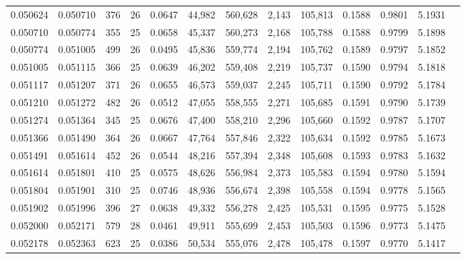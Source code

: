 \begin{tabular}{rrrrrrrrrrrrr}
0.050624 & 0.050710 & 376 &  26 &                                     0.0647 &  44,982 & 560,628 &   2,143 & 105,813 & 0.1588 & 0.9801 & 5.1931 \\
0.050710 & 0.050774 & 355 &  25 &                                     0.0658 &  45,337 & 560,273 &   2,168 & 105,788 & 0.1588 & 0.9799 & 5.1898 \\
0.050774 & 0.051005 & 499 &  26 &                                     0.0495 &  45,836 & 559,774 &   2,194 & 105,762 & 0.1589 & 0.9797 & 5.1852 \\
0.051005 & 0.051115 & 366 &  25 &                                     0.0639 &  46,202 & 559,408 &   2,219 & 105,737 & 0.1590 & 0.9794 & 5.1818 \\
0.051117 & 0.051207 & 371 &  26 &                                     0.0655 &  46,573 & 559,037 &   2,245 & 105,711 & 0.1590 & 0.9792 & 5.1784 \\
0.051210 & 0.051272 & 482 &  26 &                                     0.0512 &  47,055 & 558,555 &   2,271 & 105,685 & 0.1591 & 0.9790 & 5.1739 \\
0.051274 & 0.051364 & 345 &  25 &                                     0.0676 &  47,400 & 558,210 &   2,296 & 105,660 & 0.1592 & 0.9787 & 5.1707 \\
0.051366 & 0.051490 & 364 &  26 &                                     0.0667 &  47,764 & 557,846 &   2,322 & 105,634 & 0.1592 & 0.9785 & 5.1673 \\
0.051491 & 0.051614 & 452 &  26 &                                     0.0544 &  48,216 & 557,394 &   2,348 & 105,608 & 0.1593 & 0.9783 & 5.1632 \\
0.051614 & 0.051801 & 410 &  25 &                                     0.0575 &  48,626 & 556,984 &   2,373 & 105,583 & 0.1594 & 0.9780 & 5.1594 \\
0.051804 & 0.051901 & 310 &  25 &                                     0.0746 &  48,936 & 556,674 &   2,398 & 105,558 & 0.1594 & 0.9778 & 5.1565 \\
0.051902 & 0.051996 & 396 &  27 &                                     0.0638 &  49,332 & 556,278 &   2,425 & 105,531 & 0.1595 & 0.9775 & 5.1528 \\
0.052000 & 0.052171 & 579 &  28 &                                     0.0461 &  49,911 & 555,699 &   2,453 & 105,503 & 0.1596 & 0.9773 & 5.1475 \\
0.052178 & 0.052363 & 623 &  25 &                                     0.0386 &  50,534 & 555,076 &   2,478 & 105,478 & 0.1597 & 0.9770 & 5.1417 \\

\end{tabular}
